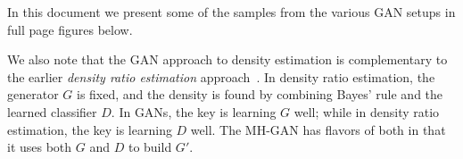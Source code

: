 \documentclass{article}
\begin{document}

In this document we present some of the samples from the various GAN setups in full page figures below.

We also note that the GAN approach to density estimation is complementary to the earlier \emph{density ratio estimation} approach~\citep{Sugiyama2012}\@.
In density ratio estimation, the generator $G$ is fixed, and the density is found by combining Bayes' rule and the learned classifier $D$.
In GANs, the key is learning $G$ well; while in density ratio estimation, the key is learning $D$ well.
The MH-GAN has flavors of both in that it uses both $G$ and $D$ to build $G'$.
\end{document}

